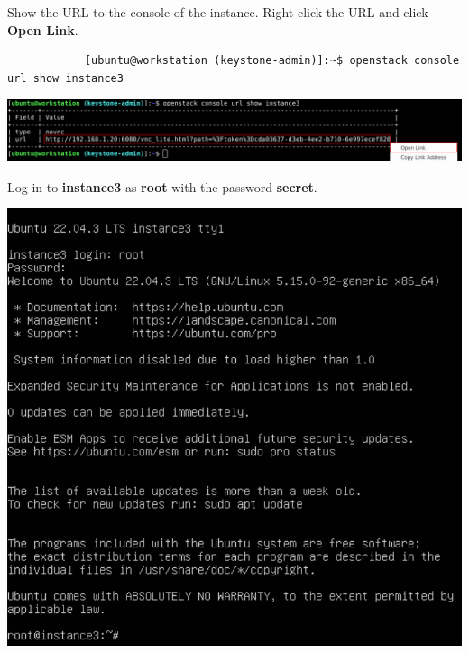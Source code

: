 \documentclass[letterpaper, 12pt]{article}
\begin{document}
\begin{enumerate}
    \begin{labstep}
        Show the URL to the console of the instance.
        Right-click the URL and click \textbf{Open Link}.
        \begin{lstlisting}
            [ubuntu@workstation (keystone-admin)]:~$ openstack console url show instance3
        \end{lstlisting}

        \begin{center}
            \includegraphics[width=\linewidth]{images/part4/step13.png}
        \end{center}
    \end{labstep}

    \begin{labstep}
        Log in to \textbf{instance3} as \textbf{root} with the password \textbf{secret}.

        \begin{center}
            \includegraphics[width=\linewidth]{images/part4/step14.png}
        \end{center}
    \end{labstep}


\end{enumerate}
\end{document}
